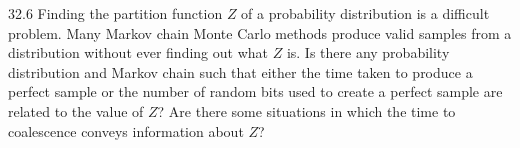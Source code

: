 \documentclass[12pt, a4paper]{article}
\begin{document}
\begin{prob}{32.6}
Finding the partition function $Z$ of a probability distribution is a difficult problem. Many Markov chain Monte Carlo methods produce valid samples from a distribution without ever finding out what $Z$ is. Is there any probability distribution and Markov chain such that either the time taken to produce a perfect sample or the number of random bits used to create a perfect sample are related to the value of $Z$? Are there some situations in which the time to coalescence conveys information about $Z$?
\end{prob}
\begin{sol}
\end{sol}
\bigskip
\end{document}

